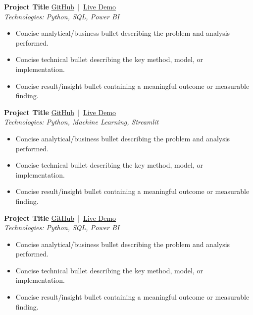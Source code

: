 \documentclass[a4paper,11pt]{article}
\newcommand{\resumeProjectHeading}[3]{
    \textbf{#1} \hfill #2 \\[2pt]
    \textit{Technologies: #3}
    \vspace{2pt}
}
\newcommand{\resumeItem}[1]{
    \item #1
}
\newcommand{\resumeProjectEnd}{
    \vspace{4pt}
}
\begin{document}

\resumeProjectHeading
{Project Title}
{
    \href{https://github.com/yourusername/project}{GitHub}
    \,|\, 
    \href{https://your-live-demo.com}{Live Demo}
}
{Python, SQL, Power BI}

\begin{itemize}
    \resumeItem{Concise analytical/business bullet describing the problem and analysis performed.}
    \resumeItem{Concise technical bullet describing the key method, model, or implementation.}
    \resumeItem{Concise result/insight bullet containing a meaningful outcome or measurable finding.}
\end{itemize}

\resumeProjectEnd

\vspace{0.18cm}

\resumeProjectHeading
{Project Title}
{
    \href{https://github.com/yourusername/project}{GitHub}
    \,|\, 
    \href{https://your-live-demo.com}{Live Demo}
}
{Python, Machine Learning, Streamlit}

\begin{itemize}
    \resumeItem{Concise analytical/business bullet describing the problem and analysis performed.}
    \resumeItem{Concise technical bullet describing the key method, model, or implementation.}
    \resumeItem{Concise result/insight bullet containing a meaningful outcome or measurable finding.}
\end{itemize}

\resumeProjectEnd

\vspace{0.18cm}

\resumeProjectHeading
{Project Title}
{
    \href{https://github.com/yourusername/project}{GitHub}
    \,|\, 
    \href{https://your-live-demo.com}{Live Demo}
}
{Python, SQL, Power BI}

\begin{itemize}
    \resumeItem{Concise analytical/business bullet describing the problem and analysis performed.}
    \resumeItem{Concise technical bullet describing the key method, model, or implementation.}
    \resumeItem{Concise result/insight bullet containing a meaningful outcome or measurable finding.}
\end{itemize}
\end{document}
